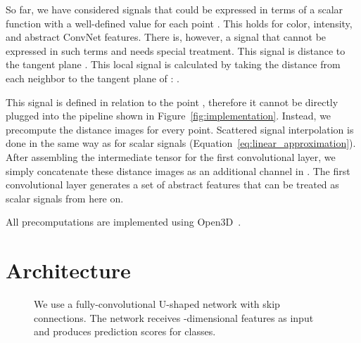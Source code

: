 \documentclass[10pt,twocolumn,letterpaper]{article}
\begin{document}
So far, we have considered signals that could be expressed in terms of a scalar function  with a well-defined value for each point .
This holds for color, intensity, and abstract ConvNet features.
There is, however, a signal that cannot be expressed in such terms and needs special treatment. This signal is distance to the tangent plane . This local signal is calculated by taking the distance from each neighbor  to the tangent plane of : .

This signal is defined in relation to the point , therefore it cannot be directly plugged into the pipeline shown in Figure~\ref{fig:implementation}.
Instead, we precompute the distance images for every point.
Scattered signal interpolation is done in the same way as for scalar signals (Equation~\eqref{eq:linear_approximation}).
After assembling the intermediate tensor  for the first convolutional layer, we simply concatenate these distance images as an additional channel in .
The first convolutional layer generates a set of abstract features  that can be treated as scalar signals from here on.

All precomputations are implemented using Open3D~\cite{zhou18}.
 
\section{Architecture}
\label{sec:architecture}
\begin{figure}
\centering
{}
\vspace{1mm}
\caption{We use a fully-convolutional U-shaped network with skip connections. The network receives -dimensional features as input and produces prediction scores for  classes.}
\label{fig:architecture}
\end{figure}
\end{document}
